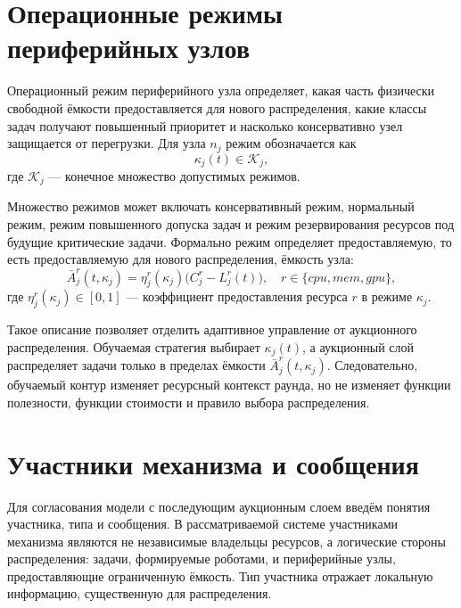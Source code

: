 \section{Операционные режимы периферийных узлов}

Операционный режим периферийного узла определяет, какая часть физически свободной ёмкости предоставляется для нового распределения, какие классы задач получают повышенный приоритет и насколько консервативно узел защищается от перегрузки. Для узла $n_j$ режим обозначается как
\begin{equation}
    \kappa_j(t)\in\mathcal{K}_j,
    \label{eq:ch2_node_mode}
\end{equation}
где $\mathcal{K}_j$ --- конечное множество допустимых режимов.

Множество режимов может включать консервативный режим, нормальный режим, режим повышенного допуска задач и режим резервирования ресурсов под будущие критические задачи. Формально режим определяет предоставляемую, то есть предоставляемую для нового распределения, ёмкость узла:
\begin{equation}
    \bar{A}^{r}_j(t,\kappa_j)=\eta^{r}_j(\kappa_j)\bigl(C^{r}_j-L^{r}_j(t)\bigr),\quad r\in\{cpu,mem,gpu\},
    \label{eq:ch2_exposed_capacity}
\end{equation}
где $\eta^{r}_j(\kappa_j)\in[0,1]$ --- коэффициент предоставления ресурса $r$ в режиме $\kappa_j$.

Такое описание позволяет отделить адаптивное управление от аукционного распределения. Обучаемая стратегия выбирает $\kappa_j(t)$, а аукционный слой распределяет задачи только в пределах ёмкости $\bar{A}^{r}_j(t,\kappa_j)$. Следовательно, обучаемый контур изменяет ресурсный контекст раунда, но не изменяет функции полезности, функции стоимости и правило выбора распределения.

\section{Участники механизма и сообщения}

Для согласования модели с последующим аукционным слоем введём понятия участника, типа и сообщения. В рассматриваемой системе участниками механизма являются не независимые владельцы ресурсов, а логические стороны распределения: задачи, формируемые роботами, и периферийные узлы, предоставляющие ограниченную ёмкость. Тип участника отражает локальную информацию, существенную для распределения.

